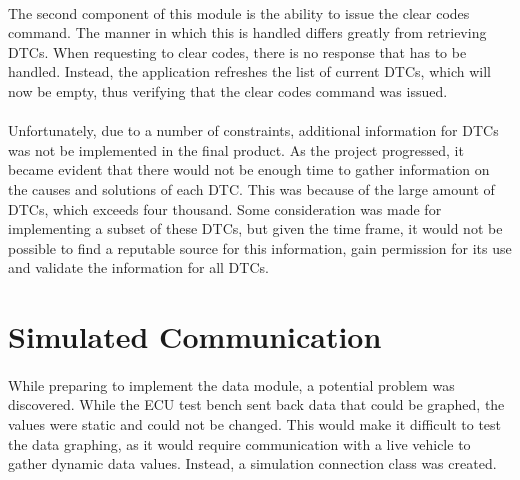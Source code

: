 		\paragraph{}{
		The second component of this module is the ability to issue the clear codes command. The manner in which this is handled differs greatly from retrieving DTCs. When requesting to clear codes, there is no response that has to be handled. Instead, the application refreshes the list of current DTCs, which will now be empty, thus verifying that the clear codes command was issued.
		}
		
		\paragraph{}{
		Unfortunately, due to a number of constraints, additional information for DTCs was not be implemented in the final product. As the project progressed, it became evident that there would not be enough time to gather information on the causes and solutions of each DTC. This was because of the large amount of DTCs, which exceeds four thousand. Some consideration was made for implementing a subset of these DTCs, but given the time frame, it would not be possible to find a reputable source for this information, gain permission for its use and validate the information for all DTCs.
		}						
\newpage		
\section{Simulated Communication}
		\paragraph{}{
		While preparing to implement the data module, a potential problem was discovered. While the ECU test bench sent back data that could be graphed, the values were static and could not be changed. This would make it difficult to test the data graphing, as it would require communication with a live vehicle to gather dynamic data values. Instead, a simulation connection class was created.
		}
